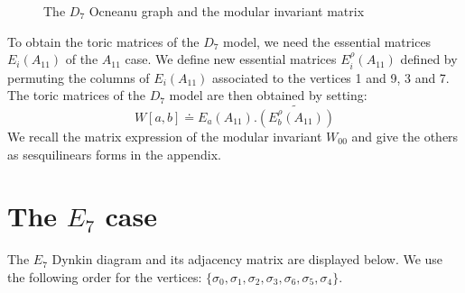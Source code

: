 \documentclass[a4paper,11pt]{article}
\let\sect=\section
\def\section{\newpage\sect}
\begin{document}
\begin{figure}[hhh]
\begin{center}
\begin{picture}
\end{picture}
\caption{The $D_7$ Ocneanu graph and the modular invariant matrix}
\label{grocD7}
\end{center}
\end{figure}


To obtain the toric matrices of the $D_7$ model, we need the
essential matrices $E_i(A_{11})$ of the $A_{11}$ case. We define new
essential matrices $E_i^{\rho}(A_{11})$ defined by
permuting the columns of $E_i(A_{11})$ associated to the vertices 1
and 9, 3 and 7.
The toric matrices of the $D_7$ model are then obtained by setting:
$$
W[a,b] \doteq E_a(A_{11}) . \widetilde{  (E_b^{\rho}(A_{11}))}
$$
We recall the matrix expression of the modular invariant $W_{00}$ and
give the others as sesquilinears forms in the appendix.






\section{The $E_{7}$ case}

The $E_7$ Dynkin diagram and its adjacency matrix are displayed
below. We use the following order for the vertices: $\{\sigma_0,
\sigma_1, \sigma_2, \sigma_3,
\sigma_6, \sigma_5, \sigma_4 \}$.
\end{document}
